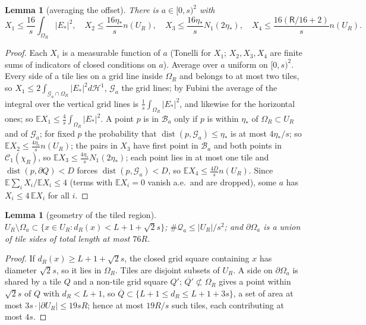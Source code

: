 \documentclass[11pt,reqno]{amsart}
\numberwithin{equation}{section}
\theoremstyle{plain}
\newtheorem{lemma}[theorem]{Lemma}
\theoremstyle{definition}
\newcommand{\dist}{\operatorname{dist}}
\newcommand{\fR}{\mathsf{R}}
\begin{document}
\begin{lemma}[averaging the offset]\label{lem:offset}
There is $a\in[0,s)^2$ with
\[
X_1\le\frac{16}s\int_{\Omega_R}|E_*|^2,\quad X_2\le\frac{16\eta_*}sn(U_R),\quad X_3\le\frac{16\eta_*}sN_1(2\eta_*),\quad X_4\le\frac{16(\fR/16+2)}sn(U_R).
\]
\end{lemma}
\begin{proof}
Each $X_i$ is a measurable function of $a$ (Tonelli for $X_1$; $X_2,X_3,X_4$ are finite sums of indicators of closed conditions on $a$).  Average over $a$ uniform on $[0,s)^2$.  Every side of a tile lies on a grid line inside $\Omega_R$ and belongs to at most two tiles, so $X_1\le2\int_{\mathcal G_a\cap\Omega_R}|E_*|^2d\mathcal H^1$, $\mathcal G_a$ the grid lines; by Fubini the average of the integral over the vertical grid lines is $\frac1s\int_{\Omega_R}|E_*|^2$, and likewise for the horizontal ones; so $\mathbb E X_1\le\frac4s\int_{\Omega_R}|E_*|^2$.  A point $p$ is in $\mathcal B_a$ only if $p$ is within $\eta_*$ of $\Omega_R\subset U_R$ and of $\mathcal G_a$; for fixed $p$ the probability that $\dist(p,\mathcal G_a)\le\eta_*$ is at most $4\eta_*/s$; so $\mathbb EX_2\le\frac{4\eta_*}sn(U_R)$; the pairs in $X_3$ have first point in $\mathcal B_a$ and both points in $\mathcal C_1(\chi_R)$, so $\mathbb EX_3\le\frac{4\eta_*}sN_1(2\eta_*)$; each point lies in at most one tile and $\dist(p,\partial Q)<D$ forces $\dist(p,\mathcal G_a)<D$, so $\mathbb EX_4\le\frac{4D}sn(U_R)$.  Since $\mathbb E\sum_iX_i/\mathbb EX_i\le4$ (terms with $\mathbb EX_i=0$ vanish a.e.\ and are dropped), some $a$ has $X_i\le4\,\mathbb EX_i$ for all $i$.
\end{proof}

\begin{lemma}[geometry of the tiled region]\label{lem:tiledgeom}
$U_R\setminus\Omega_a\subset\{x\in U_R:d_R(x)<L+1+\sqrt2s\}$; $\#\mathcal Q_a\le|U_R|/s^2$; and $\partial\Omega_a$ is a union of tile sides of total length at most $76R$.
\end{lemma}
\begin{proof}
If $d_R(x)\ge L+1+\sqrt2s$, the closed grid square containing $x$ has diameter $\sqrt2s$, so it lies in $\Omega_R$.  Tiles are disjoint subsets of $U_R$.  A side on $\partial\Omega_a$ is shared by a tile $Q$ and a non-tile grid square $Q'$; $\overline{Q'}\not\subset\Omega_R$ gives a point within $\sqrt2s$ of $Q$ with $d_R<L+1$, so $\overline Q\subset\{L+1\le d_R\le L+1+3s\}$, a set of area at most $3s\cdot|\partial U_R|\le19sR$; hence at most $19R/s$ such tiles, each contributing at most $4s$.
\end{proof}
\end{document}
